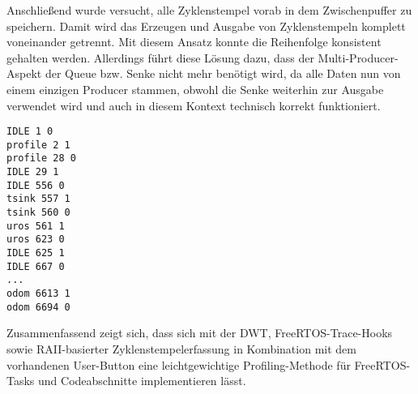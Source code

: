 Anschließend wurde versucht, alle Zyklenstempel vorab in dem Zwischenpuffer zu
speichern. Damit wird das Erzeugen und Ausgabe von Zyklenstempeln komplett
voneinander getrennt. Mit diesem Ansatz konnte die Reihenfolge konsistent
gehalten werden. Allerdings führt diese Lösung dazu, dass der
Multi-Producer-Aspekt der Queue bzw. Senke nicht mehr benötigt wird, da alle
Daten nun von einem einzigen Producer stammen, obwohl die Senke weiterhin zur
Ausgabe verwendet wird und auch in diesem Kontext technisch korrekt
funktioniert.

\begin{code}
\begin{verbatim}
IDLE 1 0
profile 2 1
profile 28 0
IDLE 29 1
IDLE 556 0
tsink 557 1
tsink 560 0
uros 561 1
uros 623 0
IDLE 625 1
IDLE 667 0
...
odom 6613 1
odom 6694 0
\end{verbatim}
\end{code}

Zusammenfassend zeigt sich, dass sich mit der DWT, FreeRTOS-Trace-Hooks sowie
RAII-basierter Zyklenstempelerfassung in Kombination mit dem vorhandenen
User-Button eine leichtgewichtige Profiling-Methode für FreeRTOS-Tasks und
Codeabschnitte implementieren lässt.
